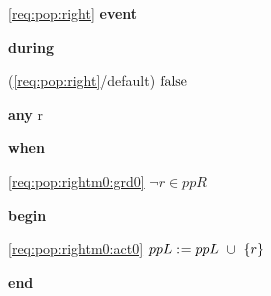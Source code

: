 \noindent \ref{req:pop:right}  \textbf{event}
\begin{block}
  \item   \textbf{during}
  \begin{block}
  \item[ (\ref{req:pop:right}/default) ]{$\text{false} $} %
  \end{block}
  \item   \textbf{any} r
  \item   \textbf{when}
  \begin{block}
  \item[ \eqref{req:pop:rightm0:grd0} ]{$\neg r \in ppR $} %
  \end{block}
  \item   \textbf{begin}
  \begin{block}
  \item[ \eqref{req:pop:rightm0:act0} ]{$ppL \mathrel{:\mkern1mu=} ppL \; \mathbin{\mkern1mu\cup\mkern1mu} \; \{r\} $} %
  \end{block}
  \item   \textbf{end} \\
\end{block}
